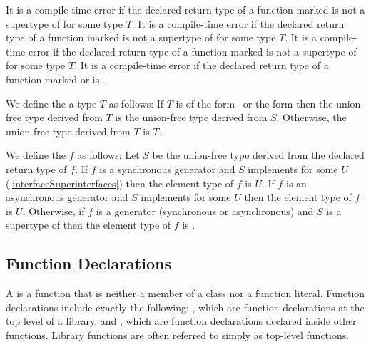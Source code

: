 \documentclass[makeidx]{article}
\begin{document}
\LMHash{}%
It is a compile-time error if the declared return type of
a function marked \ASYNC{} is not
a supertype of  for some type $T$.
It is a compile-time error if the declared return type of
a function marked \code{\SYNC*} is not
a supertype of  for some type $T$.
It is a compile-time error if the declared return type of
a function marked \code{\ASYNC*} is not
a supertype of  for some type $T$.
It is a compile-time error if the declared return type of
a function marked \code{\SYNC*} or \code{\ASYNC*} is \VOID.

\LMHash{}%
We define the
a type $T$ as follows:
If $T$ is of the form \ or the form 
then the union-free type derived from $T$ is
the union-free type derived from $S$.
Otherwise, the union-free type derived from $T$ is $T$.

\LMHash{}%
We define the
$f$ as follows:
%
Let $S$ be the union-free type derived from the declared return type of $f$.
%
If $f$ is a synchronous generator and
$S$ implements  for some $U$
(\ref{interfaceSuperinterfaces})
then the element type of $f$ is $U$.
%
If $f$ is an asynchronous generator and
$S$ implements  for some $U$
then the element type of $f$ is $U$.
%
Otherwise, if $f$ is a generator (synchronous or asynchronous)
and $S$ is a supertype of 
then the element type of $f$ is \DYNAMIC.


\subsection{Function Declarations}

\LMHash{}%
A  is a function that
is neither a member of a class nor a function literal.
Function declarations include exactly the following:
,
which are function declarations
at the top level of a library, and
,
which are function declarations declared inside other functions.
Library functions are often referred to simply as top-level functions.
\end{document}
